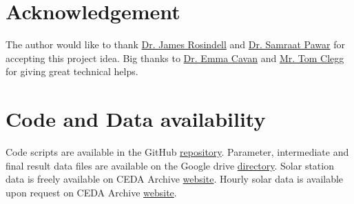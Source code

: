 \documentclass[../thesis.tex]{subfiles} %
\begin{document}
\section{Acknowledgement}
The author would like to thank \href{mailto:j.rosindell@imperial.ac.uk}{Dr. James Rosindell} and \href{mailto:s.pawar@imperial.ac.uk}{Dr. Samraat Pawar} for accepting this project idea.  
Big thanks to \href{mailto:e.cavan@imperial.ac.uk}{Dr. Emma Cavan} and \href{mailto:t.clegg17@imperial.ac.uk}{Mr. Tom Clegg} for giving great technical helps.

\section{Code and Data availability}
Code scripts are available in the GitHub \href{https://github.com/ph-u/Project}{repository}.  Parameter, intermediate and final result data files are available on the Google drive \href{https://drive.google.com/drive/folders/1tp2miPXis7bn-km1THC3ZaRHSRXQGCi5?usp=sharing}{directory}.  Solar station data is freely available on CEDA Archive \href{http://archive.ceda.ac.uk/midas_stations/google_earth/}{website}.  Hourly solar data is available upon request on CEDA Archive \href{https://catalogue.ceda.ac.uk/uuid/220a65615218d5c9cc9e4785a3234bd0}{website}.
\end{document}
